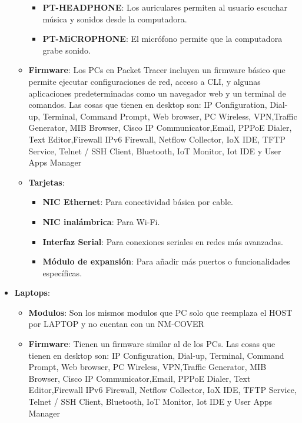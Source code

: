 \documentclass{article}
\begin{document}
\begin{itemize}
\begin{itemize}
\begin{itemize}
                    \item\textbf{PT-HEADPHONE}: Los auriculares permiten al usuario escuchar música y sonidos desde la computadora.
                    \item\textbf{PT-MiCROPHONE}: El micrófono permite que la computadora grabe sonido.
                \end{itemize}
                \item\textbf{Firmware}: Los PCs en Packet Tracer incluyen un firmware básico que permite ejecutar configuraciones de red, acceso a CLI, y algunas aplicaciones predeterminadas como un navegador web y un terminal de comandos.
                Las cosas que tienen en desktop son:
                IP Configuration, Dial-up, Terminal, Command Prompt, Web browser, PC Wireless, VPN,Traffic Generator, MIB Browser, Cisco IP Communicator,Email, PPPoE Dialer, Text Editor,Firewall IPv6 Firewall, Netflow Collector, IoX IDE, TFTP Service, Telnet / SSH Client, Bluetooth, IoT Monitor, Iot IDE y User Apps Manager
                \item\textbf{Tarjetas}:
                \begin{itemize}
                    \item\textbf{NIC Ethernet}: Para conectividad básica por cable.
                    \item\textbf{NIC inalámbrica}: Para Wi-Fi.
                    \item\textbf{Interfaz Serial}: Para conexiones seriales en redes más avanzadas.
                    \item\textbf{Módulo de expansión}: Para añadir más puertos o funcionalidades específicas.
                \end{itemize}
            \end{itemize}
           \item\textbf{Laptops}: 
           \begin{itemize}
                \item\textbf{Modulos}: Son los mismos modulos que PC solo que reemplaza el HOST por LAPTOP y no cuentan con un NM-COVER 
                \item\textbf{Firmware}: Tienen un firmware similar al de los PCs.
                Las cosas que tienen en desktop son:
                IP Configuration, Dial-up, Terminal, Command Prompt, Web browser, PC Wireless, VPN,Traffic Generator, MIB Browser, Cisco IP Communicator,Email, PPPoE Dialer, Text Editor,Firewall IPv6 Firewall, Netflow Collector, IoX IDE, TFTP Service, Telnet / SSH Client, Bluetooth, IoT Monitor, Iot IDE y User Apps Manager

\end{itemize}
\end{itemize}
\end{document}
